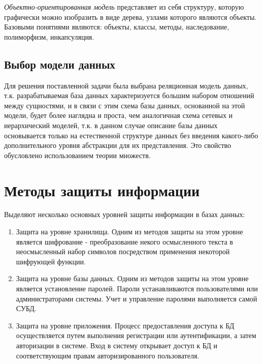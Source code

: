 \textit{Объектно-ориентированная модель} представляет из себя структуру, которую графически можно изобразить в виде дерева, узлами которого являются объекты. Базовыми понятиями являются: объекты, классы, методы, наследование, полиморфизм, инкапсуляция.

\subsection*{Выбор модели данных}

Для решения поставленной задачи была выбрана реляционная модель данных, т.к. разрабатываемая база данных характеризуется большим набором отношений между сущностями, и в связи с этим схема базы данных, основанной на этой модели, будет более наглядна и проста, чем аналогичная схема сетевых и иерархический моделей, т.к. в данном случае описание базы данных основывается только на естественной структуре данных без введения какого-либо дополнительного уровня абстракции для их представления. Это свойство обусловлено использованием теории множеств.


\section{Методы защиты информации}

Выделяют несколько основных уровней защиты информации в базах данных:

\begin{enumerate}
	\item Защита на уровне хранилища. Одним из методов защиты на этом уровне является шифрование -  преобразование некого осмысленного текста в неосмысленный набор символов посредством применения некоторой шифрующей функции\cite{def-online}.
	\item Защита на уровне базы данных. Одним из методов защиты на этом уровне является установление паролей. Пароли устанавливаются пользователями или администраторами системы. Учет и управление паролями выполняется самой СУБД\cite{def-book}\cite{ops}.
	\item Защита на уровне приложения. Процесс предоставления доступа к БД осуществляется путем выполнения регистрации или аутентификации, а затем авторизации в системе. Вход в систему открывает доступ к БД и соответствующим правам авторизированного пользователя.
\end{enumerate}

